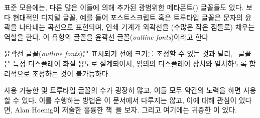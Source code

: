 표준 모음에는, 다른 많은 이들에 의해 추가된 광범위한 메타폰트(\metafont)
글꼴들도 있다.
보다 현대적인 디지털 글꼴, 예를 들어
포스트스크립트
혹은 트루타입
글꼴은 문자의 윤곽을 나타내는 곡선으로 표현되며, 인쇄 기계가 외곽선을
(수많은 작은 점들로) 채우는 역할을 한다.
이 유형의 글꼴을 윤곽선 글꼴(\emph{outline fonts})이라고
한다


윤곽선 글꼴(\emph{outline fonts})은 표시되기 전에 크기를 조정할 수 있는 것과 달리,
\metafont\ 글꼴은 특정 디스플레이 화질 용도로 설계되어서, 임의의 디스플레이 장치와 일치하도록 합리적으로 조정하는 것이 불가능하다.



사용 가능한 \pscript{} 및 트루타입 글꼴의 수가 굉장히 많고, 이들 모두 약간의 노력을 하면  사용할 수 있다.
이를 수행하는 방법은 이 문서에서 다루지는 않고, 이에 대해 관심이 있다면, Alan Hoenig이 저술한 훌륭한 책~\cite{HOENIG98}을 보자.
그리고 여기에는 귀중한  \cite[Chapter 7 Fonts and Encodings(글꼴과 인코딩)]{COMPANION} 이 있다.


